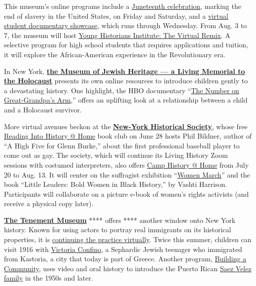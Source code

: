 This museum's online programs include a
\href{https://nmaahc.si.edu/event/juneteenth-celebration-resilience?trumbaEmbed=view\%3Devent\%26eventid\%3D145373621}{Juneteenth
celebration}, marking the end of slavery in the United States, on Friday
and Saturday, and a
\href{https://nmaahc.si.edu/event/nhd-nmaahc-virtual-student-documentary-showcase?trumbaEmbed=view\%3Devent\%26eventid\%3D143246785}{virtual
student documentary showcase}, which runs through Wednesday. From Aug. 3
to 7, the museum will host
\href{https://nmaahc.si.edu/learn/students/young-historians-institute-virtual-remix}{Young
Historians Institute: The Virtual Remix}. A selective program for high
school students that requires applications and tuition, it will explore
the African-American experience in the Revolutionary era.

In New York, \textbf{\href{https://mjhnyc.org/}{the Museum of Jewish
Heritage --- a Living Memorial to the Holocaust}} presents its own
online resources to introduce children gently to a devastating history.
One highlight, the HBO documentary
``\href{https://www.nytimes.com/2018/04/19/arts/events-for-children-in-nyc-this-week.html}{The
Number on Great-Grandpa's Arm},'' offers an uplifting look at a
relationship between a child and a Holocaust survivor.

More virtual avenues beckon at the
\textbf{\href{https://www.nyhistory.org/}{New-York Historical Society}},
whose free
\href{https://www.nyhistory.org/childrens-museum/family-programs?reading-history-home-high-five-glenn-burke/june/28/2020}{Reading
Into History @ Home} book club on June 28 hosts Phil Bildner, author of
``A High Five for Glenn Burke,'' about the first professional baseball
player to come out as gay. The society, which will continue its Living
History Zoom sessions with costumed interpreters, also offers
\href{https://www.nyhistory.org/childrens-museum/family-programs?camp-history-home-women-march/july/20/2020}{Camp
History @ Home} from July 20 to Aug. 13. It will center on the
suffragist exhibition
``\href{https://www.nyhistory.org/exhibitions/women-march}{Women
March}'' and the book ``Little Leaders: Bold Women in Black History,''
by Vashti Harrison. Participants will collaborate on a picture e-book of
women's rights activists (and receive a physical copy later).

\textbf{\href{https://www.tenement.org/}{The Tenement Museum}} ****
offers **** another window onto New York history. Known for using actors
to portray real immigrants on its historical properties, it is
\href{https://www.tenement.org/events/}{continuing the practice
virtually}. Twice this summer, children can visit 1916 with
\href{https://www.tenement.org/events/virtual-family-event-meet-victoria-confino-june-24/}{Victoria
Confino}, a Sephardic Jewish teenager who immigrated from Kastoria, a
city that today is part of Greece. Another program,
\href{https://www.tenement.org/events/virtual-family-event-building-a-community-july-8/}{Building
a Community}, uses video and oral history to introduce the Puerto Rican
\href{https://www.tenement.org/events/virtual-family-event-building-a-community-july-8/}{Saez
Velez family} in the 1950s and later.

